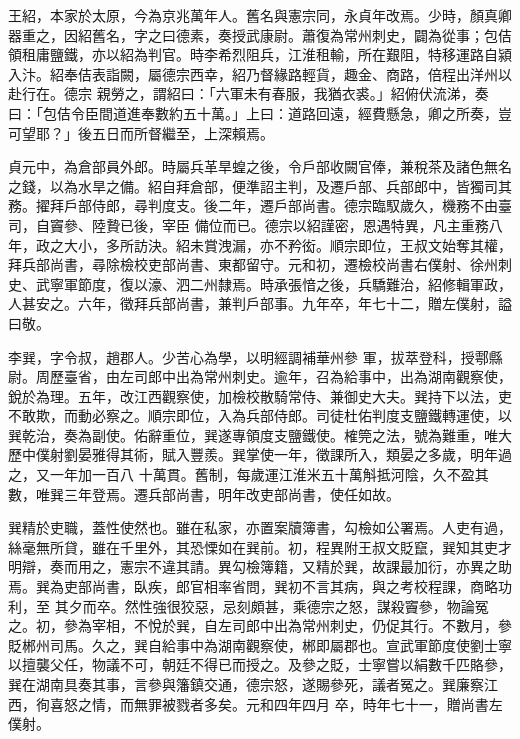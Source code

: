 \begin{pinyinscope}
 王紹，本家於太原，今為京兆萬年人。舊名與憲宗同，永貞年改焉。少時，顏真卿器重之，因紹舊名，字之曰德素，奏授武康尉。蕭復為常州刺史，闢為從事；包佶領租庸鹽鐵，亦以紹為判官。時李希烈阻兵，江淮租輸，所在艱阻，特移運路自潁入汴。紹奉佶表詣闕，屬德宗西幸，紹乃督緣路輕貨，趣金、商路，倍程出洋州以赴行在。德宗
 親勞之，謂紹曰：「六軍未有春服，我猶衣裘。」紹俯伏流涕，奏曰：「包佶令臣間道進奉數約五十萬。」上曰：道路回遠，經費懸急，卿之所奏，豈可望耶？」後五日而所督繼至，上深賴焉。



 貞元中，為倉部員外郎。時屬兵革旱蝗之後，令戶部收闕官俸，兼稅茶及諸色無名之錢，以為水旱之備。紹自拜倉部，便準詔主判，及遷戶部、兵部郎中，皆獨司其務。擢拜戶部侍郎，尋判度支。後二年，遷戶部尚書。德宗臨馭歲久，機務不由臺司，自竇參、陸贄已後，宰臣
 備位而已。德宗以紹謹密，恩遇特異，凡主重務八年，政之大小，多所訪決。紹未賞洩漏，亦不矜衒。順宗即位，王叔文始奪其權，拜兵部尚書，尋除檢校吏部尚書、東都留守。元和初，遷檢校尚書右僕射、徐州刺史、武寧軍節度，復以濠、泗二州隸焉。時承張愔之後，兵驕難治，紹修輯軍政，人甚安之。六年，徵拜兵部尚書，兼判戶部事。九年卒，年七十二，贈左僕射，謚曰敬。



 李巽，字令叔，趙郡人。少苦心為學，以明經調補華州參
 軍，拔萃登科，授鄠縣尉。周歷臺省，由左司郎中出為常州刺史。逾年，召為給事中，出為湖南觀察使，銳於為理。五年，改江西觀察使，加檢校散騎常侍、兼御史大夫。巽持下以法，吏不敢欺，而動必察之。順宗即位，入為兵部侍郎。司徒杜佑判度支鹽鐵轉運使，以巽乾治，奏為副使。佑辭重位，巽遂專領度支鹽鐵使。榷筦之法，號為難重，唯大歷中僕射劉晏雅得其術，賦入豐羨。巽掌使一年，徵課所入，類晏之多歲，明年過之，又一年加一百八
 十萬貫。舊制，每歲運江淮米五十萬斛抵河陰，久不盈其數，唯巽三年登焉。遷兵部尚書，明年改吏部尚書，使任如故。



 巽精於吏職，蓋性使然也。雖在私家，亦置案牘簿書，勾檢如公署焉。人吏有過，絲毫無所貸，雖在千里外，其恐慄如在巽前。初，程異附王叔文貶竄，巽知其吏才明辯，奏而用之，憲宗不違其請。異勾檢簿籍，又精於巽，故課最加衍，亦異之助焉。巽為吏部尚書，臥疾，郎官相率省問，巽初不言其病，與之考校程課，商略功利，至
 其夕而卒。然性強很狡惡，忌刻頗甚，乘德宗之怒，謀殺竇參，物論冤之。初，參為宰相，不悅於巽，自左司郎中出為常州刺史，仍促其行。不數月，參貶郴州司馬。久之，巽自給事中為湖南觀察使，郴即屬郡也。宣武軍節度使劉士寧以擅襲父任，物議不可，朝廷不得已而授之。及參之貶，士寧嘗以絹數千匹賂參，巽在湖南具奏其事，言參與籓鎮交通，德宗怒，遂賜參死，議者冤之。巽廉察江西，徇喜怒之情，而無罪被戮者多矣。元和四年四月
 卒，時年七十一，贈尚書左僕射。




\end{pinyinscope}
